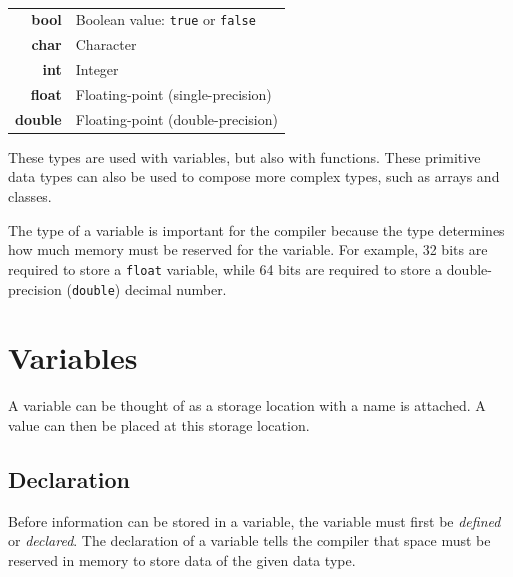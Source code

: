 \documentclass[11pt,fleqn]{book} %
\begin{document}
\begin{definition}
	\label{definition:primitive-data-types}
	\phantom{ } \\
	\begin{minipage}{\columnwidth}
		\vspace{0.1cm}
		\begin{tabular}{rl}
			\textbf{bool} & Boolean value: \texttt{true} or \texttt{false} \\
			\textbf{char} & Character \\
			\textbf{int} & Integer \\
			\textbf{float} & Floating-point (single-precision) \\
			\textbf{double} & Floating-point (double-precision)
		\end{tabular}
		\vspace{0.1cm}
	\end{minipage}
\end{definition}



\noindent These types are used with variables, but also with functions. These primitive data types can also be used to compose more complex types, such as  arrays and classes.

\begin{remark}
    The type of a variable is important for the compiler because the type determines how much memory must be reserved for the variable. For example, 32 bits are required to store a \texttt{float} variable, while 64 bits are required to store a double-precision (\texttt{double}) decimal number.
\end{remark}

\section{Variables}
A variable can be thought of as a storage location with a name is attached. A value can then be placed at this storage location.
\subsection{Declaration}
Before information can be stored in a variable, the variable must first be \emph{defined} or \emph{declared}. The declaration of a variable tells the compiler that space must be reserved in memory to store data of the given data type.\\
\end{document}
